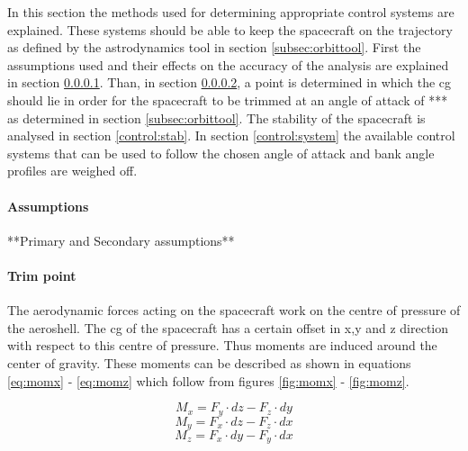 In this section the methods used for determining appropriate control systems are explained. These systems should be able to keep the spacecraft on the trajectory as defined by the astrodynamics tool in section \ref{subsec:orbittool}. First the assumptions used and their effects on the accuracy of the analysis are explained in section \ref{control:assumptions}. Than, in section \ref{control:trim}, a point is determined in which the \gls{cg} should lie in order for the spacecraft to be trimmed at an angle of attack of *** as determined in section  \ref{subsec:orbittool}. The stability of the spacecraft is analysed in section \ref{control:stab}. In section \ref{control:system} the available control systems that can be used to follow the chosen angle of attack and bank angle profiles are weighed off.

\paragraph{Assumptions}
\label{control:assumptions}
**Primary and Secondary assumptions**

\paragraph{Trim point}
\label{control:trim}
The aerodynamic forces acting on the spacecraft work on the centre of pressure of the aeroshell. The \gls{cg} of the spacecraft has a certain offset in x,y and z direction with respect to this centre of pressure. Thus moments are induced around the center of gravity. These moments can be described as shown in equations \ref{eq:momx} - \ref{eq:momz} which follow from figures \ref{fig:momx} - \ref{fig:momz}.

\begin{equation}
\label{eq:momx}
M_x = F_y \cdot dz - F_z \cdot dy
\end{equation}
\begin{equation}
\label{eq:momy}
M_y = F_x \cdot dz - F_z \cdot dx
\end{equation}
\begin{equation}
\label{eq:momz}
M_z = F_x \cdot dy - F_y \cdot dx
\end{equation}

